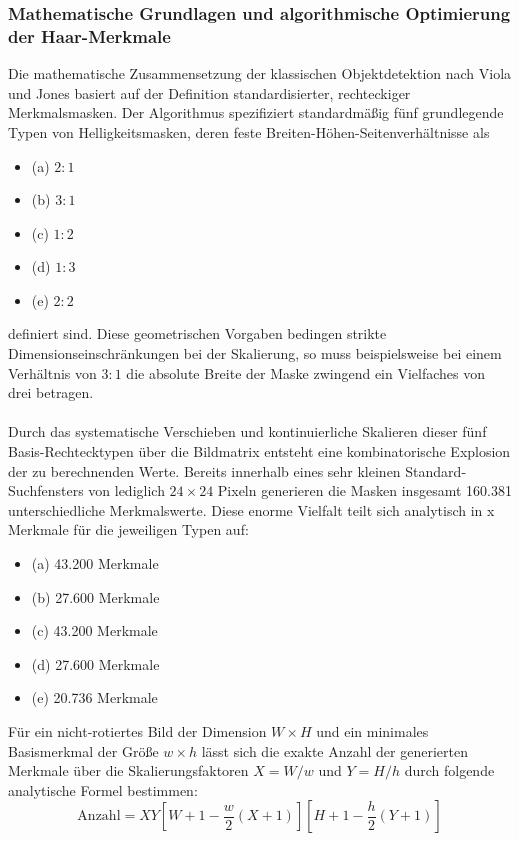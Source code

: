 \subsubsection{Mathematische Grundlagen und algorithmische Optimierung der Haar-Merkmale}
Die mathematische Zusammensetzung der klassischen Objektdetektion nach Viola und Jones basiert auf der Definition standardisierter, rechteckiger Merkmalsmasken. Der Algorithmus spezifiziert standardmäßig fünf grundlegende Typen von Helligkeitsmasken, deren feste Breiten-Höhen-Seitenverhältnisse als 
\begin{itemize}
	\item (a) $2:1$
	\item (b) $3:1$
	\item (c) $1:2$
	\item (d) $1:3$
	\item (e) $2:2$
\end{itemize}
definiert sind. Diese geometrischen Vorgaben bedingen strikte Dimensionseinschränkungen bei der Skalierung, so muss beispielsweise bei einem Verhältnis von $3:1$ die absolute Breite der Maske zwingend ein Vielfaches von drei betragen. 
\\
\\Durch das systematische Verschieben und kontinuierliche Skalieren dieser fünf Basis-Rechtecktypen über die Bildmatrix entsteht eine kombinatorische Explosion der zu berechnenden Werte. Bereits innerhalb eines sehr kleinen Standard-Suchfensters von lediglich $24 \times 24$ Pixeln generieren die Masken insgesamt 160.381 unterschiedliche Merkmalswerte. Diese enorme Vielfalt teilt sich analytisch in x Merkmale für die jeweiligen Typen auf:
\newpage 
\begin{itemize}
	\item (a) 43.200 Merkmale
	\item (b) 27.600 Merkmale
	\item (c) 43.200 Merkmale
	\item (d) 27.600 Merkmale
	\item (e) 20.736 Merkmale
\end{itemize} 
Für ein nicht-rotiertes Bild der Dimension $W \times H$ und ein minimales Basismerkmal der Größe $w \times h$ lässt sich die exakte Anzahl der generierten Merkmale über die Skalierungsfaktoren $X = W/w$ und $Y = H/h$ durch folgende analytische Formel bestimmen:
\begin{equation}
	\text{Anzahl} = X Y \left[ W + 1 - \frac{w}{2}(X + 1) \right] \left[ H + 1 - \frac{h}{2}(Y + 1) \right]
	\label{Anzahl Merkmale}
\end{equation}
